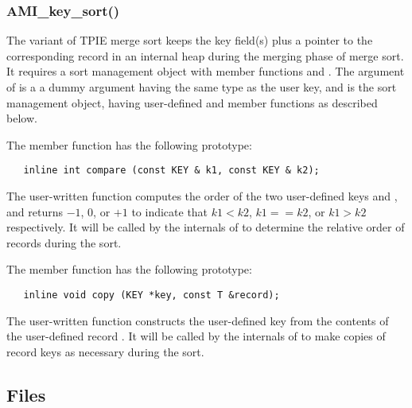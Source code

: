 
\subsubsection{AMI\_key\_sort()}

The  variant of TPIE merge sort keeps
the key field(s) plus a pointer to the corresponding record
in an internal heap during the merging phase of merge sort.
It requires a sort management object with member functions
 and .
The  argument of  is a a
dummy argument having the same type as the user key, and
 is the sort management
object, having user-defined  and
 member functions as described below.

The  member function has the following
prototype:
\begin{verbatim}
   inline int compare (const KEY & k1, const KEY & k2);
\end{verbatim}

The user-written  function computes the
order of the two user-defined keys  and
, and returns $-1$, $0$, or $+1$ to indicate that
$k1<k2$, $k1==k2$, or $k1>k2$ respectively.
It will be called by the internals of  to
determine the relative order of records during the sort.

The  member function has the following
prototype:
\begin{verbatim}
   inline void copy (KEY *key, const T &record);
\end{verbatim}

The user-written  function constructs the
user-defined key  from the contents of the
user-defined record . It will be called by the
internals of  to make copies of record
keys as necessary during the sort.



\subsection{Files}
  \btabb
	 {}
  \etabb

